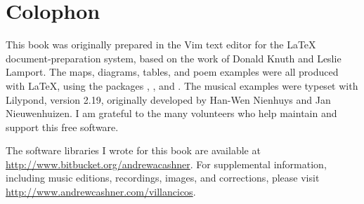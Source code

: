 \section*{Colophon}

This book was originally prepared in the Vim text editor for the \LaTeX{}
document-preparation system, based on the work of Donald Knuth and Leslie
Lamport.
The maps, diagrams, tables, and poem examples were all produced with \LaTeX{},
using the packages , , and .
The musical examples were typeset with Lilypond, version 2.19, originally
developed by Han-Wen Nienhuys and Jan Nieuwenhuizen.
I am grateful to the many volunteers who help maintain and support this
free software.

The software libraries I wrote for this book are available at
\url{http://www.bitbucket.org/andrewacashner}.
For supplemental information, including music editions, recordings, images,
and corrections, please visit \url{http://www.andrewcashner.com/villancicos}.

